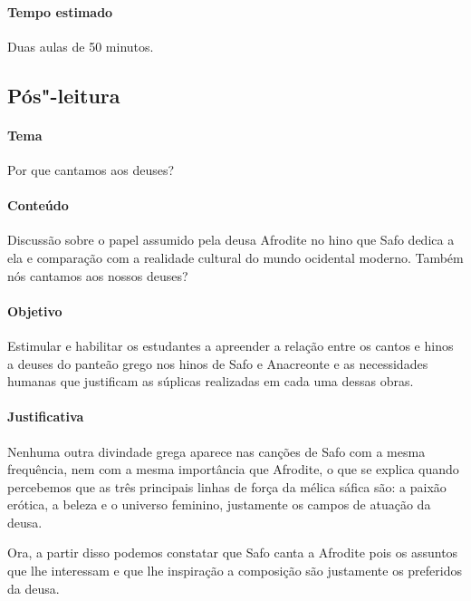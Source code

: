 \documentclass[12pt]{extarticle}
\begin{document}
\paragraph{Tempo estimado} Duas aulas de 50 minutos.


\subsection{Pós"-leitura}

\paragraph{Tema} Por que cantamos aos deuses?

\paragraph{Conteúdo} Discussão sobre o papel assumido pela deusa Afrodite no hino que 
Safo dedica a ela e comparação com a realidade cultural do mundo ocidental moderno.
Também nós cantamos aos nossos deuses?

\paragraph{Objetivo} Estimular e habilitar os estudantes a apreender a relação
entre os cantos e hinos a deuses do panteão grego nos hinos de Safo e Anacreonte 
e as necessidades humanas que justificam as súplicas realizadas em cada uma
dessas obras. 

\paragraph{Justificativa} Nenhuma outra divindade grega aparece nas canções de Safo
com a mesma frequência, nem com a mesma importância que Afrodite, o que se explica
quando percebemos que as três principais linhas de força da mélica sáfica são:
a paixão erótica, a beleza e o universo feminino, justamente os campos de atuação da deusa.

Ora, a partir disso podemos constatar que Safo canta a Afrodite pois os assuntos
que lhe interessam e que lhe inspiração a composição são justamente os preferidos
da deusa. 
\end{document}
